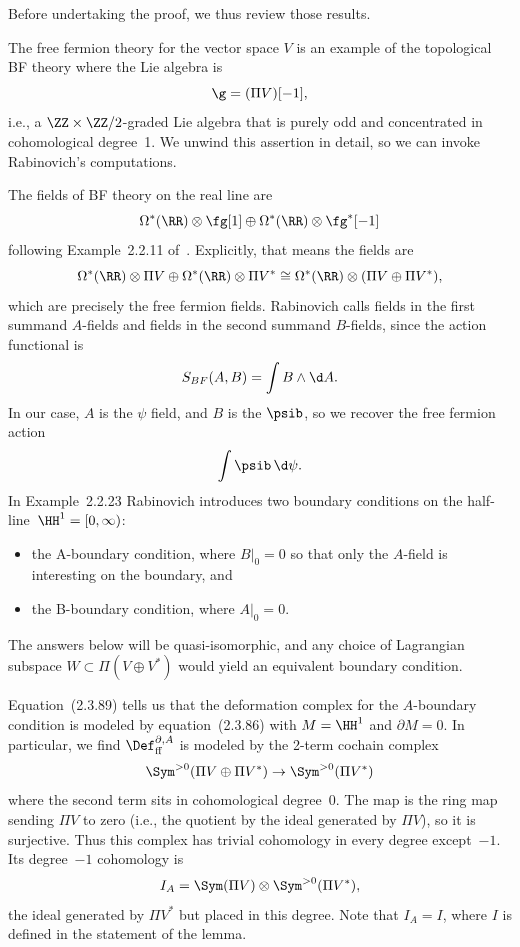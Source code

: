\documentclass[10pt]{amsart}
\begin{document}
Before undertaking the proof, 
we thus review those results.

The free fermion theory for the vector space $V$ is an example of the topological BF theory where the Lie algebra is
\[
\g = (\Pi V)[-1],
\]
i.e., a $\ZZ \times \ZZ/2$-graded Lie algebra that is purely odd and concentrated in cohomological degree~1.
We unwind this assertion in detail, 
so we can invoke Rabinovich's computations.

The fields of BF theory on the real line are
\[
\Omega^*(\RR) \otimes \fg[1] \oplus \Omega^*(\RR) \otimes \fg^*[-1]
\]
following Example~2.2.11 of~\cite{RabThesis}.
Explicitly, that means the fields are
\[
\Omega^*(\RR) \otimes \Pi V \oplus \Omega^*(\RR) \otimes \Pi V^* \cong 
\Omega^*(\RR) \otimes (\Pi V \oplus \Pi V^*),
\]
which are precisely the free fermion fields.
Rabinovich calls fields in the first summand $A$-fields and fields in the second summand $B$-fields,
since the action functional is
\[
S_{BF}(A,B) = \int B \wedge \d A.
\]
In our case, $A$ is the $\psi$ field, and $B$ is the $\psib$,
so we recover the free fermion action
\[
\int \psib \,\d \psi.
\]
In Example~2.2.23 Rabinovich introduces two boundary conditions on the half-line~$\HH^1 = [0,\infty)$: 
\begin{itemize}
\item the A-boundary condition, where $B|_0 = 0$ so that only the $A$-field is interesting on the boundary, and
\item the B-boundary condition, where $A|_0 = 0$.
\end{itemize}
The answers below will be quasi-isomorphic,
and any choice of Lagrangian subspace $W \subset \Pi(V \oplus V^*)$ would yield an equivalent boundary condition.

Equation~(2.3.89) tells us that the deformation complex for the $A$-boundary condition is modeled by equation~(2.3.86) with $M = \HH^1$ and $\partial M = 0$.
In particular, we find $\Def^{\partial,A}_{\rm ff}$ is modeled by the 2-term cochain complex
\begin{equation}
\label{eqn: ff def cplx}
\Sym^{>0}(\Pi V \oplus \Pi V^*) \to \Sym^{>0}(\Pi V^*)
\end{equation}
where the second term sits in cohomological degree~0.
The map is the ring map sending $\Pi V$ to zero (i.e., the quotient by the ideal generated by $\Pi V$), 
so it is surjective.
Thus this complex has trivial cohomology in every degree except~$-1$.
Its degree~$-1$ cohomology is
\begin{equation}
\label{eqn: ff def H}
I_A = \Sym(\Pi V) \otimes \Sym^{>0}(\Pi V^*),
\end{equation}
the ideal generated by $\Pi V^*$ but placed in this degree.
Note that $I_A = I$, where $I$ is defined in the statement of the lemma.
\end{document}
